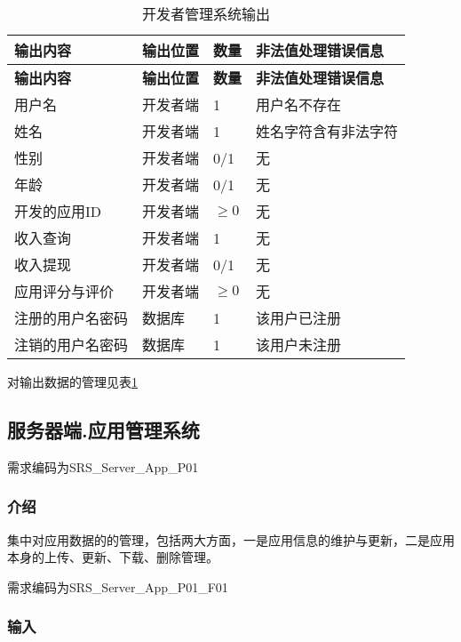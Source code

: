 \begin{longtable}{|p{3cm}|p{4cm}|p{1cm}|p{6cm}|}
\caption{开发者管理系统输出}\label{tab:concrete_dev_sys_output} \\
\hline
\textbf{输出内容} & \textbf{输出位置} & \textbf{数量}  & \textbf{非法值处理错误信息}    \\
\hline
\endfirsthead
\hline
\textbf{输出内容} & \textbf{输出位置} & \textbf{数量}  & \textbf{非法值处理错误信息}  \\
\hline
\endhead
\hline 
\endfoot
\hline
\endlastfoot

用户名 & 开发者端 & 1 & 用户名不存在\\
姓名 & 开发者端 & 1 & 姓名字符含有非法字符\\
性别 & 开发者端 & 0/1 & 无\\
年龄 & 开发者端 & 0/1 & 无\\
开发的应用ID & 开发者端 & $\ge 0$ & 无\\
收入查询 & 开发者端 & 1 & 无\\
收入提现 & 开发者端 & 0/1 & 无\\
应用评分与评价 & 开发者端 & $\ge 0$ & 无\\
注册的用户名密码 & 数据库 & 1 & 该用户已注册\\
注销的用户名密码 & 数据库 & 1 & 该用户未注册 \\

\end{longtable}
	
对输出数据的管理见表\ref{tab:concrete_dev_sys_output}




\subsection{服务器端.应用管理系统}
需求编码为SRS\_Server\_App\_P01

\subsubsection{介绍}
集中对应用数据的的管理，包括两大方面，一是应用信息的维护与更新，二是应用本身的上传、更新、下载、删除管理。

需求编码为SRS\_Server\_App\_P01\_F01

\subsubsection{输入}

